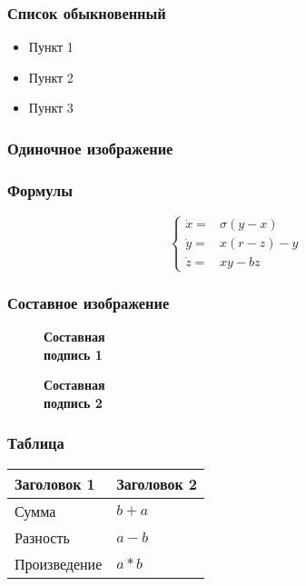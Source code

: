 \documentclass[14pt]{beamer}
\begin{document}
\begin{frame}
\frametitle{Список обыкновенный}
\begin{itemize}
  \item Пункт 1
  \item Пункт 2
  \item Пункт 3
\end{itemize}
\end{frame}

\begin{frame}
\frametitle{Одиночное изображение}
\begin{figure}[H]
  \centering
\end{figure}
\end{frame}

\begin{frame}
\frametitle{Формулы}
\[
\left\{
  \begin{array}{rl}
    \dot x = & \sigma (y-x) \\
    \dot y = & x (r - z) - y \\
    \dot z = & xy - bz
  \end{array}
\right.
\]
\end{frame}

\begin{frame}
\frametitle{Составное изображение}
\begin{figure}[h]
  \begin{minipage}[h]{0.49\linewidth}
    \textbf{Составная \\ подпись 1}
  \end{minipage}
  \hfill
  \begin{minipage}[h]{0.49\linewidth}
    \textbf{Составная \\ подпись 2}
  \end{minipage}
\end{figure}
\end{frame}

\begin{frame}
\frametitle{Таблица}
\begin{tabular}{|l|l|}
\hline
\textbf{Заголовок 1} & \textbf{Заголовок 2} \\
\hline
Сумма & $b+a$ \\
\hline
Разность & $a-b$ \\
\hline
Произведение & $a*b$ \\
\hline
\end{tabular}
\end{frame}
\end{document}
